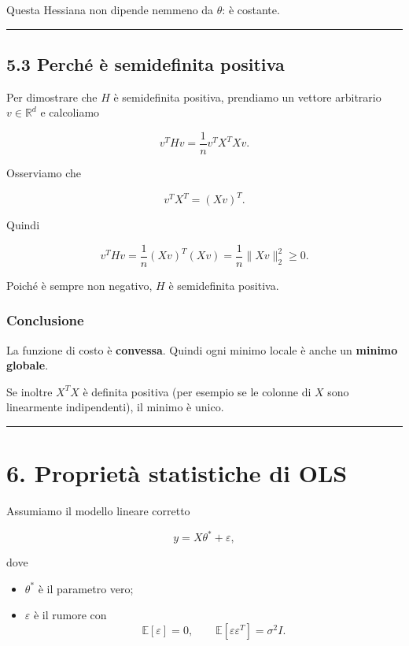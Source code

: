 \documentclass{article}
\providecommand{\tightlist}{%
  \setlength{\itemsep}{0pt}\setlength{\parskip}{0pt}}
\begin{document}
Questa Hessiana non dipende nemmeno da \(\theta\): è costante.

\begin{center}\rule{0.5\linewidth}{0.5pt}\end{center}

\subsection{5.3 Perché è semidefinita
positiva}\label{perchuxe9-uxe8-semidefinita-positiva}

Per dimostrare che \(H\) è semidefinita positiva, prendiamo un vettore
arbitrario \(v\in\mathbb{R}^d\) e calcoliamo

\[
v^THv = \frac{1}{n}v^TX^TXv.
\]

Osserviamo che

\[
v^TX^T = (Xv)^T.
\]

Quindi

\[
v^THv = \frac{1}{n}(Xv)^T(Xv)=\frac{1}{n}\|Xv\|_2^2 \ge 0.
\]

Poiché è sempre non negativo, \(H\) è semidefinita positiva.

\subsubsection{Conclusione}\label{conclusione-3}

La funzione di costo è \textbf{convessa}. Quindi ogni minimo locale è
anche un \textbf{minimo globale}.

Se inoltre \(X^TX\) è definita positiva (per esempio se le colonne di
\(X\) sono linearmente indipendenti), il minimo è unico.

\begin{center}\rule{0.5\linewidth}{0.5pt}\end{center}

\section{6. Proprietà statistiche di
OLS}\label{proprietuxe0-statistiche-di-ols}

Assumiamo il modello lineare corretto

\[
y = X\theta^* + \varepsilon,
\]

dove

\begin{itemize}
\tightlist
\item
  \(\theta^*\) è il parametro vero;
\item
  \(\varepsilon\) è il rumore con \[
  \mathbb{E}[\varepsilon]=0,\qquad \mathbb{E}[\varepsilon\varepsilon^T]=\sigma^2 I.
  \]
\end{itemize}
\end{document}
